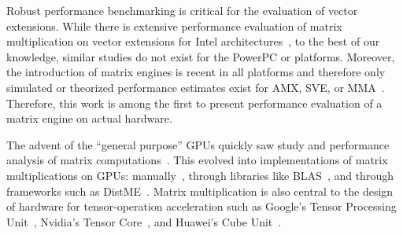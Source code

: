 \documentclass[\main/thesis.tex]{subfiles}
\begin{document}

Robust performance benchmarking is critical for the evaluation of vector extensions.
While there is extensive performance evaluation of matrix multiplication on vector extensions for  Intel architectures~\cite{2016hassan,2020hemeida,2020alappat}, to the best of our knowledge, similar studies do not exist for the PowerPC or \Arm platforms.
Moreover, the introduction of matrix engines is recent in all platforms and therefore only simulated or theorized performance estimates exist for AMX, SVE, or MMA~\cite{2020poenaru,DomkeIPDPS21}.
Therefore, this work is among the first to present performance evaluation of a matrix engine on actual hardware.

The advent of the ``general purpose'' GPUs quickly saw study and performance analysis of matrix computations~\cite{2001larsen,2004fatahalian}.
This evolved into implementations of matrix multiplications on GPUs: manually~\cite{2011li}, through libraries like BLAS~\cite{2011nath}, and through frameworks such as DistME~\cite{2019han}.
Matrix multiplication is also central to the design of hardware for tensor-operation acceleration such as Google's Tensor Processing Unit~\cite{JouppiISCA17}, Nvidia's Tensor Core~\cite{2018markidis}, and Huawei's Cube Unit~\cite{2019liao}.
\end{document}
